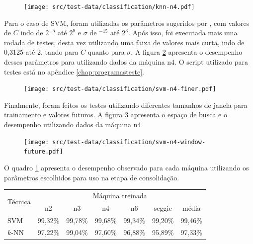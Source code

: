 \begin{figure}[htp]
\centering
\texttt{[image: src/test-data/classification/knn-n4.pdf]}
\label{fig:knnn4}
\end{figure}

Para o caso de SVM, foram utilizadas os parâmetros sugeridos por
, com valores de $C$ indo de $2^{-5}$ até
$2^9$ e $\sigma$ de $^{-15}$ até $2^{3}$.  Após
isso, foi executada mais uma rodada de testes, desta vez utilizando uma
faixa de valores mais curta, indo de 0,3125 até 2, tando para $C$ quanto
para $\sigma$. A figura \ref{fig:svmn4} apresenta o desempenho desses parâmetros
para utilizando dados da máquina n4. O script utilizado para testes está no
apêndice \ref{chap:programasteste}.


\begin{figure}[htp]
\centering
\texttt{[image: src/test-data/classification/svm-n4-finer.pdf]}
\label{fig:svmn4}
\end{figure}

Finalmente, foram feitos os testes utilizando diferentes tamanhos de janela
para trainamento e valores futuros. A figura \ref{fig:svmwindowfuturen4} apresenta o
espaço de busca e o desempenho utilizando dados da máquina n4.

\begin{figure}[htp]
\centering
\texttt{[image: src/test-data/classification/svm-n4-window-future.pdf]}
\label{fig:svmwindowfuturen4}
\end{figure}

O quadro \ref{quadro:clageral} apresenta o desempenho observado para cada
máquina utilizando os parâmetros escolhidos para uso na etapa de consolidação.

\begin{table}[htp]
\centering
\hspace{-2cm} %
\label{quadro:clageral}
\begin{tabular}{| l | c | c | c | c | c | c |}
\hline
\multirow{2}{*}{Técnica} & \multicolumn{6}{c|}{Máquina treinada} \\
\cline{2-7}
		& n2      & n3       & n4      	 & n6        & seggie  	 & média   \\
\hline
SVM     	& 99,32\%  & 99,78\% &   99,68\% &   99,34\% &   99,20\% & 99,46\% \\
\hline
$k$-NN  	& 97,22\%  & 99,04\% &   97,60\% &   96,88\% &   95,89\% & 97,33\% \\
\hline
\end{tabular}
\end{table}


